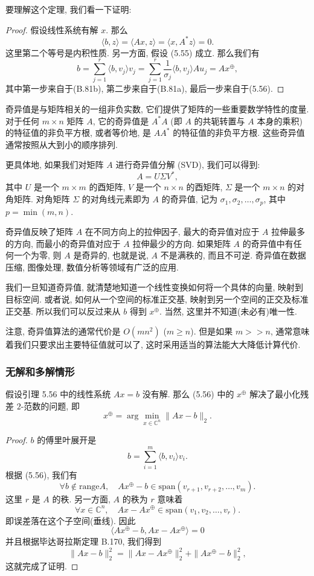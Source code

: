 \documentclass[a4paper]{ctexart}
\newcommand{\hl}[1]
{\noindent {\bf {#1}}}
\begin{document}
{要理解这个定理, 我们看一下证明: 

\begin{proof}
假设线性系统有解 $x$. 那么
  \[ 
    \langle b, z \rangle = \langle Ax, z \rangle = \langle x, A^* z \rangle = 0. 
  \]
  这里第二个等号是内积性质. 另一方面, 假设 (5.55) 成立. 那么我们有
  \[ 
  b = \sum_{j=1}^{r} \langle b, v_j \rangle v_j 
  = \sum_{j=1}^{r} \frac{1}{\sigma_j} \langle b, v_j \rangle A u_j 
  = Ax^{\oplus}, 
  \]
其中第一步来自于(B.81b), 第二步来自于(B.81a), 最后一步来自于(5.56). 
\end{proof}

奇异值是与矩阵相关的一组非负实数, 它们提供了矩阵的一些重要数学特性的度量. 
对于任何 $m \times n$ 矩阵 $A$, 它的奇异值是 $A^*A$ (即 $A$ 的共轭转置与 $A$ 本身的乘积) 
的特征值的非负平方根, 或者等价地, 是 $AA^*$ 的特征值的非负平方根. 
这些奇异值通常按照从大到小的顺序排列. 

更具体地, 如果我们对矩阵 $A$ 进行奇异值分解 (SVD), 我们可以得到:
\[ 
A = U\Sigma V^*, 
\]
其中 $U$ 是一个 $m \times m$ 的酉矩阵, $V$ 是一个 $n \times n$ 的酉矩阵, 
$\Sigma$ 是一个 $m \times n$ 的对角矩阵. 
对角矩阵 $\Sigma$ 的对角线元素即为 $A$ 的奇异值, 记为
$\sigma_1, \sigma_2, \ldots, \sigma_p$, 其中 $p = \min(m, n)$.

奇异值反映了矩阵 $A$ 在不同方向上的拉伸因子, 最大的奇异值对应于 $A$ 拉伸最多的方向, 
而最小的奇异值对应于 $A$ 拉伸最少的方向. 如果矩阵 $A$ 的奇异值中有任何一个为零, 
则 $A$ 是奇异的, 也就是说, $A$ 不是满秩的, 而且不可逆. 奇异值在数据压缩, 
图像处理, 数值分析等领域有广泛的应用. 

我们一旦知道奇异值, 就清楚地知道一个线性变换如何将一个具体的向量, 映射到目标空间. 或者说, 
如何从一个空间的标准正交基, 映射到另一个空间的正交及标准正交基.
所以我们可以反过来从 $b$ 得到 $x^{\oplus}$. 当然, 这里并不知道(未必有)唯一性. 

注意, 奇异值算法的通常代价是 $O(mn^2)$ ($m \geq n$). 但是如果 $m >> n$, 
通常意味着我们只要求出主要特征值就可以了, 这时采用适当的算法能大大降低计算代价. 


\subsubsection{无解和多解情形}

\hl{定理5.57} 假设引理 5.56 中的线性系统 $Ax = b$ 没有解. 那么 (5.56) 
中的 $x^{\oplus}$ 解决了最小化残差 $2$-范数的问题, 即
\[ 
x^{\oplus} = \arg\min_{x \in \mathbb{C}^n} \|Ax - b\|_2. 
\]

\begin{proof}
$b$ 的傅里叶展开是
\[ 
b = \sum_{i=1}^{m} \langle b, v_i \rangle v_i. 
\]
根据 (5.56), 我们有
\[ 
\forall b \notin \text{range} A, \quad 
Ax^{\oplus} - b \in \text{span}(v_{r+1}, v_{r+2}, \ldots, v_m). 
\]
这里 $r$ 是 $A$ 的秩. 另一方面, $A$ 的秩为 $r$ 意味着
\[ 
\forall x \in \mathbb{C}^n, \quad 
Ax - Ax^{\oplus} \in \text{span}(v_1, v_2, \ldots, v_r). 
\]
即误差落在这个子空间(垂线). 因此
\[ 
\langle Ax^{\oplus} - b, Ax - Ax^{\oplus} \rangle = 0 
\]
并且根据毕达哥拉斯定理 B.170, 我们得到
\[
\|Ax - b\|_2^2 = \|Ax - Ax^{\oplus}\|_2^2 + \|Ax^{\oplus} - b\|_2^2, 
\]
这就完成了证明.
\end{proof}

}
\end{document}
